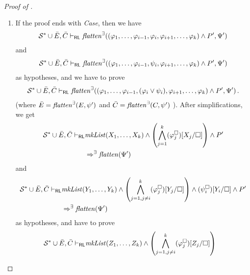 \begin{proof}[Proof of ]
\begin{enumerate}
    \item If the proof ends with \emph{Case}, then we have
        \begin{equation*}
            \mathcal{S}^* \cup \Bar{E}, \Bar{C} \vdash_{\mathsf{RL}}
            \mathit{flatten}^\exists((\varphi_1, \ldots, \varphi_{i-1}, \varphi_i, \varphi_{i+1}, \ldots, \varphi_k) \land P^\prime, \Psi^\prime)
        \end{equation*}
        and
        \begin{equation*}
            \mathcal{S}^* \cup \Bar{E}, \Bar{C} \vdash_{\mathsf{RL}}
            \mathit{flatten}^\exists((\varphi_1, \ldots, \varphi_{i-1}, \psi_i, \varphi_{i+1}, \ldots, \varphi_k) \land P^\prime, \Psi^\prime) 
        \end{equation*}
        as hypotheses, and we have to prove
        \begin{equation*}
            \mathcal{S}^* \cup \Bar{E}, \Bar{C} \vdash_{\mathsf{RL}}
            \mathit{flatten}^\exists((\varphi_1, \ldots, \varphi_{i-1}, (\varphi_i \lor \psi_i), \varphi_{i+1}, \ldots, \varphi_k) \land P^\prime, \Psi^\prime)               \, .
        \end{equation*}
        (where $\Bar{E} = \mathit{flatten}^\exists(E, \psi^\prime)$
         and $\Bar{C} = \mathit{flatten}^\exists(C, \psi^\prime)$
        ).
        After simplifications, we get
        \begin{align*}
            \mathcal{S}^* \cup \Bar{E}, \Bar{C} \vdash_{\mathsf{RL}}
            &
            \mathit{mkList}(X_1, \ldots, X_k) \land \left( \bigwedge_{j=1}^{k} (\varphi_j^\square)[X_j/\square] \right) \land P^\prime
            \\ & \Rightarrow^\exists
            \mathit{flatten}(\Psi^\prime)
        \end{align*}
        and
        \begin{align*}
            \mathcal{S}^* \cup \Bar{E}, \Bar{C} \vdash_{\mathsf{RL}}
            &
            \mathit{mkList}(Y_1, \ldots, Y_k) \land \left(\bigwedge_{j=1, j \not = i}^{k} (\varphi_j^\square)[Y_j/\square] \right)
            \land (\psi_i^\square)[Y_i/\square] \land P^\prime
            \\ & \Rightarrow^\exists
            \mathit{flatten}(\Psi^\prime)
        \end{align*}
        as hypotheses,
        and have to prove
        \begin{align*}
            \mathcal{S}^* \cup \Bar{E}, \Bar{C} \vdash_\RL
            &
            \mathit{mkList}(Z_1, \ldots, Z_k) \land \left(\bigwedge_{j=1,j \not = i}^{k} (\varphi_j^\square)[Z_j/\square]\right)

\end{align*}
\end{enumerate}
\end{proof}
